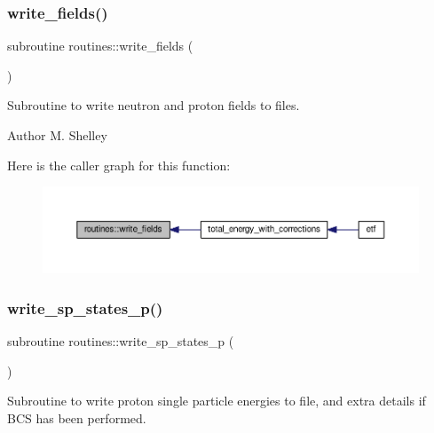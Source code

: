 \subsubsection{\texorpdfstring{write\+\_\+fields()}{write\_fields()}}
{\footnotesize\ttfamily subroutine routines\+::write\+\_\+fields (\begin{DoxyParamCaption}{ }\end{DoxyParamCaption})}



Subroutine to write neutron and proton fields to files. 

\begin{DoxyAuthor}{Author}
M. Shelley 
\end{DoxyAuthor}
Here is the caller graph for this function\+:
\nopagebreak
\begin{figure}[H]
\begin{center}
\leavevmode
\includegraphics[width=350pt]{namespaceroutines_a4a59953c814b7fa48f2c4bf31d1763a2_icgraph}
\end{center}
\end{figure}
\mbox{\label{namespaceroutines_ad51ac6c5da6056a5346d7b15b3fbe7b4}} 
\subsubsection{\texorpdfstring{write\+\_\+sp\+\_\+states\+\_\+p()}{write\_sp\_states\_p()}}
{\footnotesize\ttfamily subroutine routines\+::write\+\_\+sp\+\_\+states\+\_\+p (\begin{DoxyParamCaption}{ }\end{DoxyParamCaption})}



Subroutine to write proton single particle energies to file, and extra details if B\+CS has been performed. 


